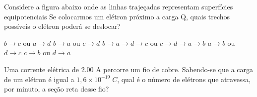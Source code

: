 \documentclass[12pt, addpoints]{exam}
\begin{document}
    \begin{questions}
\begin{multicols*}{2}
\question Considere a figura abaixo onde as linhas trajeçadas representam superfícies equipotenciais Se colocarmos um elétron próximo a carga Q, quais trechos possíveis o elétron poderá se deslocar?
        
        \begin{center}
            \begin{minipage}[c]{0.5\linewidth}
            \end{minipage}
        \end{center}
        
        

\begin{choices}
\choice $b\rightarrow c$ ou $a\rightarrow d$ 
\choice $b\rightarrow a$ ou $c\rightarrow d$ 
\choice $b\rightarrow a\rightarrow d\rightarrow c$ ou $c\rightarrow d\rightarrow a\rightarrow b$ 
\choice $a\rightarrow b$ ou $d\rightarrow c$ 
\choice $c\rightarrow b$ ou $d\rightarrow a$ 
\end{choices}
\question Uma corrente elétrica de    2.00 A percorre um ﬁo de cobre. Sabendo-se que a carga de um elétron é igual a $1,6\times 10^{-19}\;C$, qual é o número de elétrons que atravessa, por minuto, a seção reta desse ﬁo?


\end{multicols*}
\end{questions}
\end{document}
